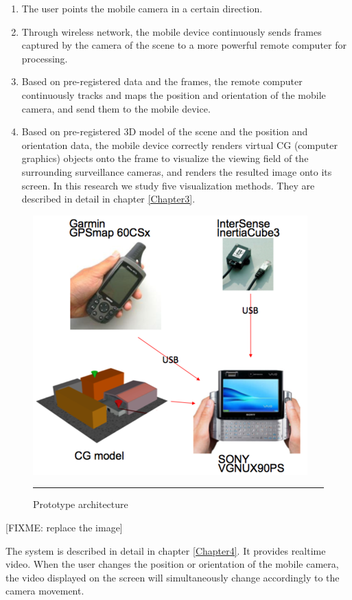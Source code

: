 \begin{enumerate}
	\item The user points the mobile camera in a certain direction.
	\item Through wireless network, the mobile device continuously sends frames captured by the camera of the scene to a more powerful remote computer for processing.
	\item Based on pre-registered data and the frames, the remote computer continuously tracks and maps the position and orientation of the mobile camera, and send them to the mobile device.
	\item Based on pre-registered 3D model of the scene and the position and orientation data, the mobile device correctly renders virtual CG (computer graphics) objects onto the frame to visualize the viewing field of the surrounding surveillance cameras, and renders the resulted image onto its screen. In this research we study five visualization methods. They are described in detail in chapter \ref{Chapter3}.
\end{enumerate}

\begin{figure}[htbp]
	\centering
	\includegraphics{./Primitives/vaio_macbookpro.png}
	\rule{35em}{0.5pt}
	\caption[Prototype architecture]{Prototype architecture}
	\label{fig:VAIOMacBookPro}
\end{figure}

[FIXME: replace the image]

The system is described in detail in chapter \ref{Chapter4}. It provides realtime video. When the user changes the position or orientation of the mobile camera, the video displayed on the screen will simultaneously change accordingly to the camera movement.

